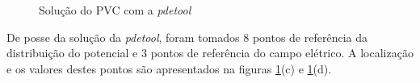 \documentclass[
    12pt,               %
    openright,          %
    oneside,
    a4paper,            %
    english,            %
    french,             %
    spanish,            %
    brazil              %
    ]{abntex2}
\begin{document}
\begin{figure}
	\qquad
	\qquad
	\caption{Solução do PVC com a \textit{pdetool}}%
	\label{fig:solPde}%
\end{figure}

De posse da solução da \textit{pdetool}, foram tomados $8$ pontos de referência da distribuição do potencial e $3$ pontos de referência do campo elétrico. A localização e os valores destes pontos são apresentados na figuras \ref{fig:solPde}{(c)} e \ref{fig:solPde}{(d)}.
\end{document}

